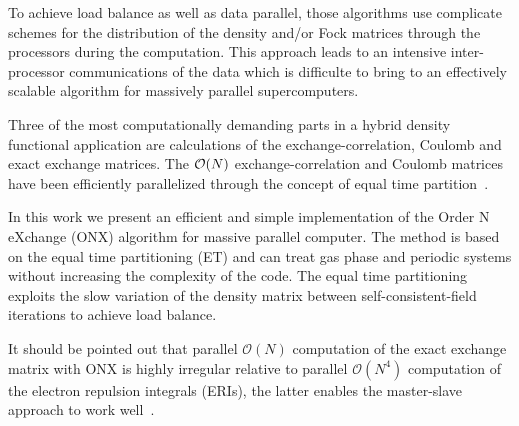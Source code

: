 \documentclass[prl,twocolumn,showpacs,twocolumngrid,superbib]{revtex4}
\begin{document}
 To achieve load balance as well as data parallel, 
 those algorithms use complicate schemes for the 
 distribution of the density and/or Fock 
 matrices through the processors during the computation.
 This approach leads to an intensive inter-processor 
 communications of the data which is difficulte to bring to an 
 effectively scalable algorithm for massively parallel supercomputers. 





 Three of the most computationally demanding parts in a 
 hybrid density functional application are calculations
 of the exchange-correlation, Coulomb and exact exchange 
 matrices. The ${\cal O}(N)$ exchange-correlation and Coulomb matrices
 have been efficiently parallelized through the concept of equal time
 partition~\cite{CGan03,CGan04B}.

 In this work we present an efficient and simple implementation 
 of the Order N eXchange (ONX) algorithm for massive parallel computer. The method
 is based on the equal time partitioning (ET) and can treat gas phase and periodic systems 
 without increasing the complexity of the code. The equal time partitioning exploits 
 the slow variation of the density matrix between self-consistent-field iterations
 to achieve load balance.
 
 It should be pointed out that parallel $\mathcal{O}(N)$ computation
 of the exact exchange matrix with ONX is highly irregular relative 
 to parallel $\mathcal{O}(N^4)$ computation of the electron repulsion integrals (ERIs), 
 the latter enables the master-slave approach to work well~\cite{RHarrison96}.
\end{document}
